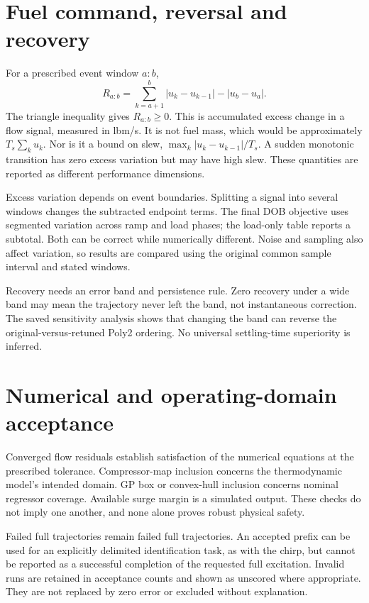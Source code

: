 \section{Fuel command, reversal and recovery}
For a prescribed event window $a{:}b$,
\begin{equation}
R_{a:b}=\sum_{k=a+1}^{b}|u_k-u_{k-1}|-|u_b-u_a|.
\end{equation}
The triangle inequality gives $R_{a:b}\ge0$. This is accumulated excess change in a flow signal, measured in lbm/s. It is not fuel mass, which would be approximately $T_s\sum_k u_k$. Nor is it a bound on slew, $\max_k|u_k-u_{k-1}|/T_s$. A sudden monotonic transition has zero excess variation but may have high slew. These quantities are reported as different performance dimensions.

Excess variation depends on event boundaries. Splitting a signal into several windows changes the subtracted endpoint terms. The final DOB objective uses segmented variation across ramp and load phases; the load-only table reports a subtotal. Both can be correct while numerically different. Noise and sampling also affect variation, so results are compared using the original common sample interval and stated windows.

Recovery needs an error band and persistence rule. Zero recovery under a wide band may mean the trajectory never left the band, not instantaneous correction. The saved sensitivity analysis shows that changing the band can reverse the original-versus-retuned Poly2 ordering. No universal settling-time superiority is inferred.

\section{Numerical and operating-domain acceptance}
Converged flow residuals establish satisfaction of the numerical equations at the prescribed tolerance. Compressor-map inclusion concerns the thermodynamic model's intended domain. GP box or convex-hull inclusion concerns nominal regressor coverage. Available surge margin is a simulated output. These checks do not imply one another, and none alone proves robust physical safety.

Failed full trajectories remain failed full trajectories. An accepted prefix can be used for an explicitly delimited identification task, as with the chirp, but cannot be reported as a successful completion of the requested full excitation. Invalid runs are retained in acceptance counts and shown as unscored where appropriate. They are not replaced by zero error or excluded without explanation.

